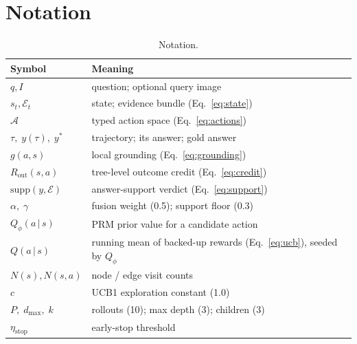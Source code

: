 \documentclass[letterpaper,twocolumn,10pt]{article}
\begin{document}
\section{Notation}
\label{app:notation}
\begin{table}[h]
\centering\small
\begin{tabular}{@{}ll@{}}
\toprule
Symbol & Meaning \\
\midrule
$q, I$ & question; optional query image \\
$s_t, \mathcal{E}_t$ & state; evidence bundle (Eq.~\ref{eq:state}) \\
$\mathcal{A}$ & typed action space (Eq.~\ref{eq:actions}) \\
$\tau,\; y(\tau),\; y^{*}$ & trajectory; its answer; gold answer \\
$g(a,s)$ & local grounding (Eq.~\ref{eq:grounding}) \\
$R_\mathrm{out}(s,a)$ & tree-level outcome credit (Eq.~\ref{eq:credit}) \\
$\mathrm{supp}(y,\mathcal{E})$ & answer-support verdict (Eq.~\ref{eq:support}) \\
$\alpha,\; \gamma$ & fusion weight (0.5); support floor (0.3) \\
$Q_{\phi}(a\,|\,s)$ & PRM prior value for a candidate action \\
$Q(a\,|\,s)$ & running mean of backed-up rewards (Eq.~\ref{eq:ucb}), seeded by $Q_{\phi}$ \\
$N(s), N(s,a)$ & node / edge visit counts \\
$c$ & UCB1 exploration constant (1.0) \\
$P,\; d_{\max},\; k$ & rollouts (10); max depth (3); children (3) \\
$\eta_{\mathrm{stop}}$ & early-stop threshold \\
\bottomrule
\end{tabular}
\caption{Notation.}
\end{table}
\end{document}
